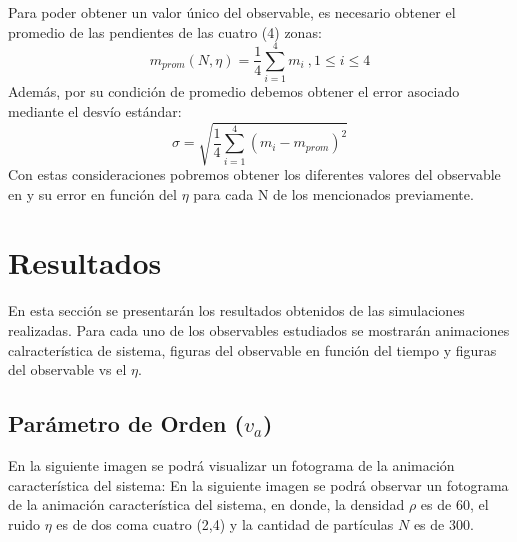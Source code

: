 \documentclass[11pt, a4paper]{article}
\begin{document}
            Para poder obtener un valor único del observable, es necesario obtener el promedio de las pendientes de las cuatro (4) zonas:
            \begin{equation}
                m_{prom}(N,\eta) = \frac{1}{4} \sum_{i=1}^{4} m_i \ , 1 \leq i \leq 4
            \end{equation}
            Además, por su condición de promedio debemos obtener el error asociado mediante el desvío estándar:
            \begin{equation}
                \sigma = \sqrt{\frac{1}{4} \sum_{i=1}^{4} (m_i - m_{prom})^2}
            \end{equation}
            Con estas consideraciones pobremos obtener los diferentes valores del observable en y su error en función del $\eta$
            para cada N de los mencionados previamente.

    \newpage

    \section{Resultados}

        En esta sección se presentarán los resultados obtenidos de las simulaciones realizadas. Para cada uno de los observables
        estudiados se mostrarán animaciones calracterística de sistema, figuras del observable en función del tiempo y figuras del
        observable vs el $\eta$.

        \subsection{Parámetro de Orden ($v_a$)}

            En la siguiente imagen se podrá visualizar un fotograma de la animación característica del sistema:
            En la siguiente imagen se podrá observar un fotograma de la animación característica del sistema, en donde,
            la densidad $\rho$ es de 60, el ruido $\eta$ es de dos coma cuatro (2,4) y la cantidad de partículas $N$ es de 300.
\end{document}
